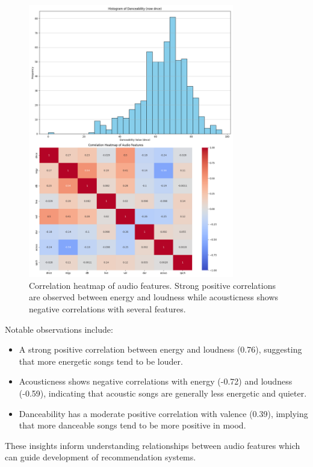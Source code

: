 \documentclass[runningheads]{llncs}
\begin{document}
\begin{figure}[h]
    \centering
    \includegraphics[width=0.8\textwidth]{correlation_heatmap.png}
    \caption{Correlation heatmap of audio features. Strong positive correlations are observed between energy and loudness while acousticness shows negative correlations with several features.}
    \label{fig:correlation}
\end{figure}

Notable observations include:

\begin{itemize}
    \item A strong positive correlation between energy and loudness (0.76), suggesting that more energetic songs tend to be louder.
    \item Acousticness shows negative correlations with energy (-0.72) and loudness (-0.59), indicating that acoustic songs are generally less energetic and quieter.
    \item Danceability has a moderate positive correlation with valence (0.39), implying that more danceable songs tend to be more positive in mood.
\end{itemize}

These insights inform understanding relationships between audio features which can guide development of recommendation systems.
\end{document}
